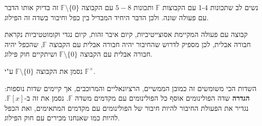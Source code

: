 \documentclass{tstextbook}
\begin{document}
\begin{remark}
נשים לב שתכונות 1-4 עם הקבוצות \(\mathbb{F}\) ותכונות \(5-8\) עם הקבוצה \(\mathbb{F} \setminus \{ 0 \}\) זה בדיוק אותו הדבר עם פעולה שונה. ולכן הדבר היחיד המבדיל בין כפל וחיבור בשדה זה הפילוג.

\end{remark}
\begin{remark}
קבוצה עם פעולה המקיימת אסוצייטיביות, קיום איבר זהות, קיום נגדי וקומוטטיביות נקראת חבורה אבלית, לכן מספיק לדרוש שהחיבור יהיה חבורה אבלית עם הקבוצה \(\mathbb{F}\), שהכפל יהיה חבורה אבלית עם הקבוצה \(\mathbb{F} \setminus \{ 0 \}\) ושיתקיים חוק פילוג.

\end{remark}
\begin{symbolize}
נסמן את הקבוצה \(\mathbb{F} \setminus \{ 0 \}\) ע"י \(\mathbb{F} ^{\times}\).

\end{symbolize}
השדות הכי משומשים זה כמובן הממשיים, הרציונאליים והמרוכבים, אך קיימים שדות נוספות:
\textbf{הגדרה} שדה הפולינומים
אוסף כל הפולינומים עם מקדמים משדה \(\mathbb{F}\). נסמן את זה ב-\(\mathbb{F} [x]\). נגדיר את הפעולת החיבור להיות חיבור של הפולינומים עם מקדמים המתאימים, ואת הכפל להיות כמו שאנחנו מכירים עם חוק הפילוג. 
\end{document}

